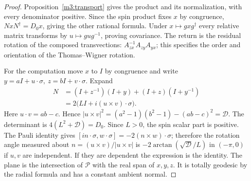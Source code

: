 \documentclass[11pt,reqno]{amsart}
\theoremstyle{definition}
\theoremstyle{remark}
\numberwithin{equation}{section}
\begin{document}
\begin{proof}
Proposition~\ref{m3:transport} gives the product and its normalization,
with every denominator positive. Since the spin product fixes \(x\)
by congruence, \(NxN^\dagger=D_0x\), giving the other rational formula.
Under \(x\mapsto gxg^\dagger\) every relative matrix transforms by
\(u\mapsto gug^{-1}\), proving covariance. The return is the residual
rotation of the composed transvections: \(A_{zx}^{-1}A_{zy}A_{yx}\);
this specifies the order and orientation of the Thomas--Wigner
rotation.

For the computation move \(x\) to \(I\) by congruence and write
\(y=aI+u\cdot\sigma,\ z=bI+v\cdot\sigma\). Expand
\[
 \begin{aligned}
 N&=(I+z^{-1})(I+y)+(I+z)(I+y^{-1})\\
  &=2\bigl(L I+i(u\times v)\cdot\sigma\bigr).
 \end{aligned}
\]
Here \(u\cdot v=ab-c\). Hence
\(|u\times v|^2=(a^2-1)(b^2-1)-(ab-c)^2=\mathcal D\).
The determinant is \(4(L^2+\mathcal D)=D_0\).
Since \(L>0\), the spin scalar part is positive.
The Pauli identity gives
\([i n\cdot\sigma,w\cdot\sigma]=-2(n\times w)\cdot\sigma\);
therefore the rotation angle measured about
\(n=(u\times v)/|u\times v|\) is
\(-2\arctan(\sqrt{\mathcal D}/L)\) in \((-\pi,0)\) if \(u,v\)
are independent. If they are dependent the expression is the identity.
The plane is the intersection of \(\mathcal P\) with the real span of
\(x,y,z\). It is totally geodesic by the radial formula and has a
constant ambient normal.


\end{proof}
\end{document}

